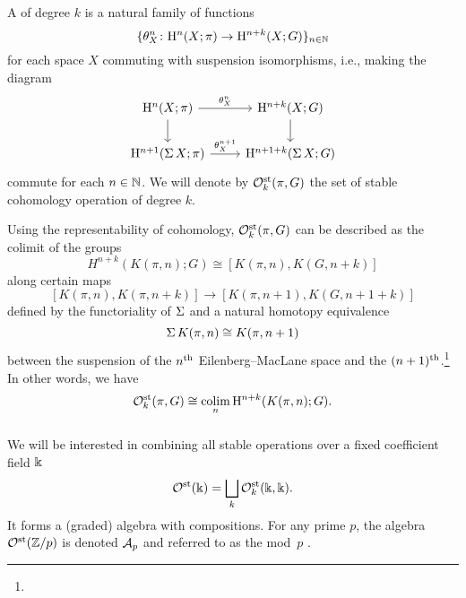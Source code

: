 \subsubsection{} A  of degree $k$ is a natural family of functions
\[
\{\theta^n_X \colon \mathrm{H}^n(X; \pi) \to \mathrm{H}^{n+k}(X; G)\}_{n \in \mathbb{N}}
\]
for each space $X$ commuting with suspension isomorphisms, i.e., making the diagram
\[
\begin{tikzcd}
	\rH^n(X; \pi) \rar["\theta^n_X"] \dar & \rH^{n+k}(X; G) \dar \\
	\rH^{n+1}(\sus X; \pi) \rar["\theta^{n+1}_X"] & \rH^{n+1+k}(\sus X; G)
\end{tikzcd}
\]
commute for each $n \in \mathbb{N}$.
We will denote by $\mathcal{O}^{\mathrm{st}}_k(\pi, G)$ the set of stable cohomology operation of degree $k$.


Using the representability of cohomology, $\mathcal{O}^{\mathrm{st}}_k(\pi, G)$ can be described as the colimit of the groups
\[
H^{n+k}(K(\pi, n); G) \cong [K(\pi, n), K(G, n+k)]
\]
along certain maps
\[
[K(\pi, n), K(\pi, n+k)] \to [K(\pi, n+1), K(G, n+1+k)]
\]
defined by the functoriality of $\operatorname{\Sigma}$ and a natural homotopy equivalence
\begin{equation}\label{eq:suspension of K(pi,n)}
	\operatorname{\Sigma} K(\pi, n) \cong K(\pi, n+1)
\end{equation}
between the suspension of the $n^{\mathrm{th}}$ Eilenberg--MacLane space and the $(n+1)^{\mathrm{th}}$.\footnote{}
In other words, we have
\[
\mathcal{O}^{\mathrm{st}}_k(\pi, G) \cong \operatorname*{colim}_n \mathrm{H}^{n+k}(K(\pi, n); G).
\]

\subsubsection{} We will be interested in combining all stable operations over a fixed coefficient field $\Bbbk$
\[
\mathcal{O}^{\mathrm{st}}(\Bbbk) = \bigsqcup_k \mathcal{O}^{\mathrm{st}}_k(\Bbbk, \Bbbk).
\]
It forms a (graded) algebra with compositions.
For any prime $p$, the algebra $\mathcal{O}^{\mathrm{st}}(\mathbb{Z}/p)$ is denoted $\mathcal{A}_p$ and referred to as the mod~$p$ .

